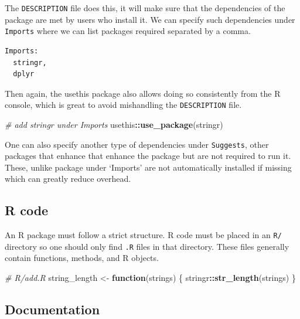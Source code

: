 \documentclass[
]{krantz}
\makeatletter
\newenvironment{Shaded}{\begin{snugshade}}{\end{snugshade}}
\newcommand{\CommentTok}[1]{\textcolor[rgb]{0.37,0.37,0.37}{\textit{#1}}}
\newcommand{\ControlFlowTok}[1]{\textcolor[rgb]{0.27,0.27,0.27}{\textbf{#1}}}
\newcommand{\KeywordTok}[1]{\textcolor[rgb]{0.27,0.27,0.27}{\textbf{#1}}}
\newcommand{\NormalTok}[1]{#1}
\newcommand{\OperatorTok}[1]{\textcolor[rgb]{0.43,0.43,0.43}{\textbf{#1}}}
\newcommand{\StringTok}[1]{\textcolor[rgb]{0.5,0.5,0.5}{#1}}
\newenvironment{kframe}{%
\medskip{}
\setlength{\fboxsep}{.8em}
 \def\at@end@of@kframe{}%
 \ifinner\ifhmode%
  \def\at@end@of@kframe{\end{minipage}}%
  \begin{minipage}{\columnwidth}%
 \fi\fi%
 \def\FrameCommand##1{\hskip\@totalleftmargin \hskip-\fboxsep
 \colorbox{shadecolor}{##1}\hskip-\fboxsep
     \hskip-\linewidth \hskip-\@totalleftmargin \hskip\columnwidth}%
 \MakeFramed {\advance\hsize-\width
   \@totalleftmargin\z@ \linewidth\hsize
   \@setminipage}}%
 {\par\unskip\endMakeFramed%
 \at@end@of@kframe}
\renewenvironment{Shaded}{\begin{kframe}}{\end{kframe}}
\makeatother
\begin{document}
The \texttt{DESCRIPTION} file does this, it will make sure that the dependencies of the package are met by users who install it. We can specify such dependencies under \texttt{Imports} where we can list packages required separated by a comma.

\begin{verbatim}
Imports:
  stringr,
  dplyr
\end{verbatim}

Then again, the usethis package also allows doing so consistently from the R console, which is great to avoid mishandling the \texttt{DESCRIPTION} file.

\begin{Shaded}
\begin{Highlighting}[]
\CommentTok{\# add stringr under Imports}
\NormalTok{usethis}\OperatorTok{::}\KeywordTok{use\_package}\NormalTok{(}\StringTok{\textquotesingle{}stringr\textquotesingle{}}\NormalTok{)}
\end{Highlighting}
\end{Shaded}

One can also specify another type of dependencies under \texttt{Suggests}, other packages that enhance that enhance the package but are not required to run it. These, unlike package under `Imports' are not automatically installed if missing which can greatly reduce overhead.

\hypertarget{r-code}{%
\subsection{R code}\label{r-code}}

An R package must follow a strict structure. R code must be placed in an \texttt{R/} directory so one should only find \texttt{.R} files in that directory. These files generally contain functions, methods, and R objects.

\begin{Shaded}
\begin{Highlighting}[]
\CommentTok{\# R/add.R}
\NormalTok{string\_length <{-}}\StringTok{ }\ControlFlowTok{function}\NormalTok{(strings) \{}
\NormalTok{  stringr}\OperatorTok{::}\KeywordTok{str\_length}\NormalTok{(strings)}
\NormalTok{\}}
\end{Highlighting}
\end{Shaded}

\hypertarget{documentation}{%
\subsection{Documentation}\label{documentation}}
\end{document}
